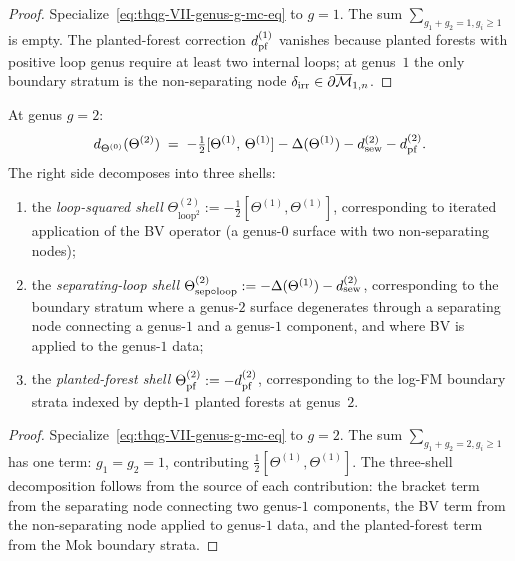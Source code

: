 \begin{proof}
Specialize~\eqref{eq:thqg-VII-genus-g-mc-eq} to $g = 1$. The
sum $\sum_{g_1+g_2=1, g_i \geq 1}$ is empty.
The planted-forest correction $d_{\mathrm{pf}}^{(1)}$ vanishes because
planted forests with positive loop genus require at least two
internal loops; at genus~$1$ the only boundary stratum is the
non-separating node $\delta_{\mathrm{irr}} \in \partial\overline{\mathcal{M}}_{1,n}$.
\end{proof}

\begin{proposition}
\label{prop:thqg-VII-genus2}
At genus $g = 2$:
\begin{equation}\label{eq:thqg-VII-mc-g2}
d_{\Theta^{(0)}}(\Theta^{(2)})
\;=\;
-\tfrac{1}{2}[\Theta^{(1)},\, \Theta^{(1)}]
- \Delta(\Theta^{(1)})
- d_{\mathrm{sew}}^{(2)}
- d_{\mathrm{pf}}^{(2)}.
\end{equation}
The right side decomposes into three shells:
\begin{enumerate}[label=\textup{(\roman*)}]
\item the \emph{loop-squared shell}
 $\Theta^{(2)}_{\mathrm{loop}^2} :=
 -\tfrac{1}{2}[\Theta^{(1)},\Theta^{(1)}]$,
 corresponding to iterated application of the BV operator
 (a genus-$0$ surface with two non-separating nodes);
\item the \emph{separating-loop shell}
 $\Theta^{(2)}_{\mathrm{sep}\circ\mathrm{loop}} :=
 -\Delta(\Theta^{(1)}) - d_{\mathrm{sew}}^{(2)}$,
 corresponding to the boundary stratum where a genus-$2$
 surface degenerates through a separating node connecting
 a genus-$1$ and a genus-$1$ component, and where BV is
 applied to the genus-$1$ data;
\item the \emph{planted-forest shell}
 $\Theta^{(2)}_{\mathrm{pf}} :=
 -d_{\mathrm{pf}}^{(2)}$,
 corresponding to the log-FM boundary strata indexed by
 depth-$1$ planted forests at genus~$2$.
\end{enumerate}
\end{proposition}

\begin{proof}
Specialize~\eqref{eq:thqg-VII-genus-g-mc-eq} to $g = 2$. The
sum $\sum_{g_1+g_2=2, g_i \geq 1}$ has one term: $g_1 = g_2 = 1$,
contributing $\tfrac{1}{2}[\Theta^{(1)},\Theta^{(1)}]$. The
three-shell decomposition follows from the source of each
contribution: the bracket term from the separating node
connecting two genus-$1$ components, the BV term from the
non-separating node applied to genus-$1$ data, and the
planted-forest term from the Mok boundary strata.
\end{proof}

